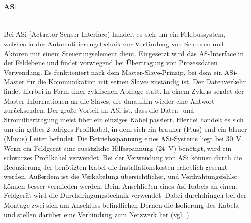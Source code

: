 \paragraph{ASi}\label{par:ASi}\mbox{}\\
Bei ASi (Actuator-Sensor-Interface) handelt es sich um ein Feldbussystem, welches in der Automatisierungstechnik zur Verbindung von Sensoren und Aktoren mit einem Steuerungselement dient. Eingesetzt wird das AS-Interface in der Feldebene und findet vorwiegend bei Übertragung von Prozessdaten Verwendung. Es funktioniert nach dem Master-Slave-Prinzip, bei dem ein ASi-Master für die Kommunikation mit seinen Slaves zuständig ist. Der Datenverkehr findet hierbei in Form einer zyklischen Abfrage statt. In einem Zyklus sendet der Master Informationen an die Slaves, die daraufhin wieder eine Antwort zurücksenden. Der große Vorteil an ASi ist, dass die Daten- und Stromübertragung meist über ein einziges Kabel passiert. Hierbei handelt es sich um ein gelbes 2-adriges Profilkabel, in dem sich ein brauner (Plus) und ein blauer (Minus) Leiter befindet. Die Betriebsspannung eines ASi-Systems liegt bei \qty{30}{\volt}. Wenn ein Feldgerät eine zusätzliche Hilfsspannung (\qty{24}{\volt}) benötigt, wird ein schwarzes Profilkabel verwendet. Bei der Verwendung von ASi können durch die Reduzierung der benötigten Kabel die Installationskosten erheblich gesenkt werden. Außerdem ist die Verkabelung übersichtlicher, und Verdrahtungsfehler können besser vermieden werden. Beim Anschließen eines Asi-Kabels an einem Feldgerät wird die Durchdringungstechnik verwendet. Dabei durchdringen bei der Montage zwei sich am Anschluss befindlichen Dornen die Isolierung des Kabels, und stellen darüber eine Verbindung zum Netzwerk her (vgl. \cite{ASi}).

